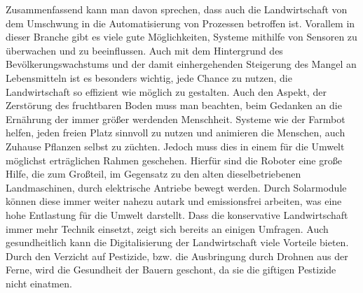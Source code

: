 Zusammenfassend kann man davon sprechen, dass auch die Landwirtschaft von dem
Umschwung in die Automatisierung von Prozessen betroffen ist. Vorallem in
dieser Branche gibt es viele gute Möglichkeiten, Systeme mithilfe von Sensoren
zu überwachen und zu beeinflussen. Auch mit dem Hintergrund des
Bevölkerungswachstums und der damit einhergehenden Steigerung des Mangel an
Lebensmitteln ist es besonders wichtig, jede Chance zu nutzen, die
Landwirtschaft so effizient wie möglich zu gestalten. Auch den Aspekt, der
Zerstörung des fruchtbaren Boden muss man beachten, beim Gedanken an die
Ernährung der immer größer werdenden Menschheit.\cite{rainer2003diskurs}
Systeme wie der Farmbot helfen, jeden freien Platz sinnvoll zu nutzen und
animieren die Menschen, auch Zuhause Pflanzen selbst zu züchten. Jedoch muss
dies in einem für die Umwelt möglichst erträglichen Rahmen geschehen. Hierfür
sind die Roboter eine große Hilfe, die zum Großteil, im Gegensatz zu den alten
dieselbetriebenen Landmaschinen, durch elektrische Antriebe bewegt werden.
Durch Solarmodule können diese immer weiter nahezu autark und emissionsfrei
arbeiten, was eine hohe Entlastung für die Umwelt darstellt. Dass die
konservative Landwirtschaft immer mehr Technik einsetzt, zeigt sich bereits an
einigen Umfragen. 
Auch gesundheitlich kann die Digitalisierung der
Landwirtschaft viele Vorteile bieten. Durch den Verzicht auf Pestizide, bzw.
die Ausbringung durch Drohnen aus der Ferne, wird die Gesundheit der Bauern
geschont, da sie die giftigen Pestizide nicht einatmen.
\cite{jungwirth2022arbeitszeitbedarf}